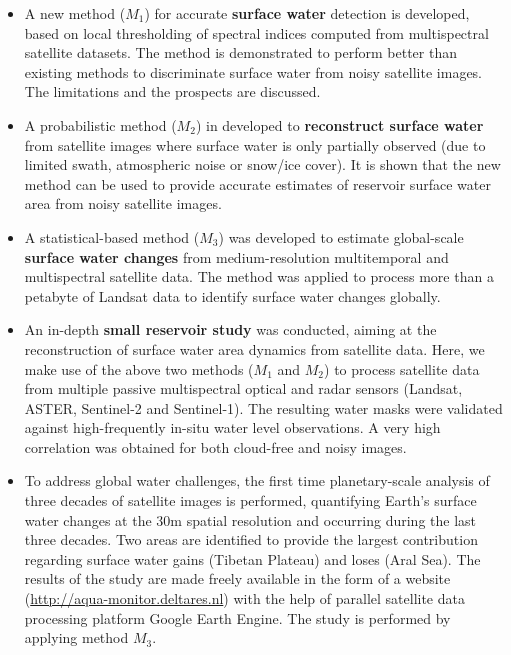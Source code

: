 \begin{itemize}
	\item A new method ($M_1$) for accurate \textbf{surface water} detection is developed, based on local thresholding of spectral indices computed from multispectral satellite datasets. The method is demonstrated to perform better than existing methods to discriminate surface water from noisy satellite images. The limitations and the prospects are discussed.
	
	\item A probabilistic method ($M_2$) in developed to \textbf{reconstruct surface water} from satellite images where surface water is only partially observed (due to limited swath, atmospheric noise or snow/ice cover). It is shown that the new method can be used to provide accurate estimates of reservoir surface water area from noisy satellite images.
	
	\item A statistical-based method ($M_3$) was developed to estimate global-scale \textbf{surface water changes} from medium-resolution multitemporal and multispectral satellite data. The method was applied to process more than a petabyte of Landsat data to identify surface water changes globally.
	
	\item An in-depth \textbf{small reservoir study} was conducted, aiming at the reconstruction of surface water area dynamics from satellite data. Here, we make use of the above two methods ($M_1$ and $M_2$)  to process satellite data from multiple passive multispectral optical and radar sensors (Landsat, ASTER, Sentinel-2 and Sentinel-1). The resulting water masks were validated against high-frequently in-situ water level observations. A very high correlation was obtained for both cloud-free and noisy images. 
	
	\item To address global water challenges, the first time planetary-scale analysis of three decades of satellite images is performed, quantifying Earth's surface water changes at the 30m spatial resolution and occurring during the last three decades. Two areas are identified to provide the largest contribution regarding surface water gains (Tibetan Plateau) and loses (Aral Sea). The results of the study are made freely available in the form of a website (\url{http://aqua-monitor.deltares.nl}) with the help of parallel satellite data processing platform Google Earth Engine. The study is performed by applying method $M_3$.
	

\end{itemize}
